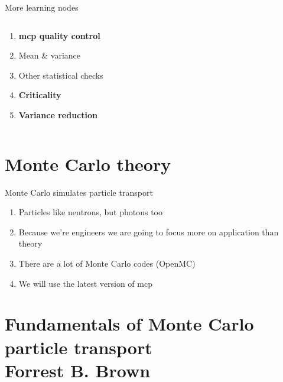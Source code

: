 \documentclass[aspectratio=1610,pdftex,dvipsnames,compress,xcolor={dvipsnames}]{beamer}
\newcommand{\acs}{\acrshort} %
\begin{document}
\begin{frame}[t]{More learning nodes}
    \begin{columns}[t]

        \begin{column}{0.50\textwidth}
            \begin{enumerate}[series=outerlist,topsep=0pt,itemsep=1pt,leftmargin=*,label=(\arabic*)]
                \item[]\textbf{\acs{mcp} quality control}
                \item[]Mean \& variance
                \item[]Other statistical checks
                    \vspace{0.15in}
                \item[]\textbf{Criticality}
                    \vspace{0.15in}
                \item[]\textbf{Variance reduction}
            \end{enumerate}
        \end{column}

        \begin{column}{0.50\textwidth}
        \end{column}

    \end{columns}
\end{frame}


\section{Monte Carlo theory}


\addtocounter{framenumber}{-1} 
\begin{frame}{Monte Carlo simulates particle transport}
    \begin{enumerate}[series=outerlist,topsep=0pt,itemsep=21pt,leftmargin=*,label=(\arabic*)]
        \item[]Particles like neutrons, but photons too
        \item[]Because we're engineers we are going to focus more on application than theory
        \item[]There are a lot of Monte Carlo codes (OpenMC)
        \item[]We will use the latest version of \acs{mcp}
    \end{enumerate}
\end{frame}


\section{Fundamentals of Monte Carlo particle transport\\Forrest B. Brown}
\end{document}
